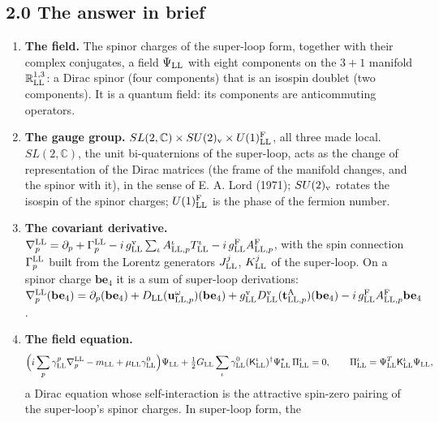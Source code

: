 \documentclass[
  10pt,
]{article}
\providecommand{\tightlist}{%
  \setlength{\itemsep}{0pt}\setlength{\parskip}{0pt}}
\begin{document}
\hypertarget{the-answer-in-brief}{%
\subsection{2.0 The answer in brief}\label{the-answer-in-brief}}

\begin{enumerate}
\def\labelenumi{\arabic{enumi}.}
\tightlist
\item
  \textbf{The field.} The spinor charges of the super-loop form,
  together with their complex conjugates, a field \(\Psi_{\rm LL}\) with
  eight components on the \(3+1\) manifold \(\mathbb R^{1,3}_{\rm LL}\):
  a Dirac spinor (four components) that is an isospin doublet (two
  components). It is a quantum field: its components are anticommuting
  operators.
\item
  \textbf{The gauge group.}
  \(SL(2,\mathbb C)\times SU(2)_{\rm v}\times U(1)^{\rm F}_{\rm LL}\),
  all three made local. \(SL(2,\mathbb C)\), the unit bi-quaternions of
  the super-loop, acts as the change of representation of the Dirac
  matrices (the frame of the manifold changes, and the spinor with it),
  in the sense of E. A. Lord (1971); \(SU(2)_{\rm v}\) rotates the
  isospin of the spinor charges; \(U(1)^{\rm F}_{\rm LL}\) is the phase
  of the fermion number.
\item
  \textbf{The covariant derivative.}
  \(\nabla^{\rm LL}_p=\partial_p+\Gamma^{\rm LL}_p-i\,g^{\rm v}_{\rm LL}\sum_\iota A^\iota_{{\rm LL},p}T^\iota_{\rm LL}-i\,g^{\rm F}_{\rm LL}A^{\rm F}_{{\rm LL},p}\),
  with the spin connection \(\Gamma^{\rm LL}_p\) built from the Lorentz
  generators \(J^j_{\rm LL}\), \(K^j_{\rm LL}\) of the super-loop. On a
  spinor charge \(\mathbf b\mathbf e_4\) it is a sum of super-loop
  derivations:
  \(\nabla^{\rm LL}_p(\mathbf b\mathbf e_4)=\partial_p(\mathbf b\mathbf e_4)+D_{\rm LL}(\mathbf u^\omega_{{\rm LL},p})(\mathbf b\mathbf e_4)+g^{\rm v}_{\rm LL}D^{\rm v}_{\rm LL}(\mathbf t^{\rm A}_{{\rm LL},p})(\mathbf b\mathbf e_4)-i\,g^{\rm F}_{\rm LL}A^{\rm F}_{{\rm LL},p}\mathbf b\mathbf e_4\).
\item
  \textbf{The field equation.}
  \[\Big(i\sum_p\gamma^p_{\rm LL}\nabla^{\rm LL}_p-m_{\rm LL}+\mu_{\rm LL}\gamma^0_{\rm LL}\Big)\Psi_{\rm LL}+\tfrac12G_{\rm LL}\sum_\iota\gamma^0_{\rm LL}(\mathsf K^\iota_{\rm LL})^\dagger\Psi^*_{\rm LL}\,\Pi^\iota_{\rm LL}=0,\qquad\Pi^\iota_{\rm LL}=\Psi^T_{\rm LL}\mathsf K^\iota_{\rm LL}\Psi_{\rm LL},\]
  a Dirac equation whose self-interaction is the attractive spin-zero
  pairing of the super-loop's spinor charges. In super-loop form, the

\end{enumerate}
\end{document}

